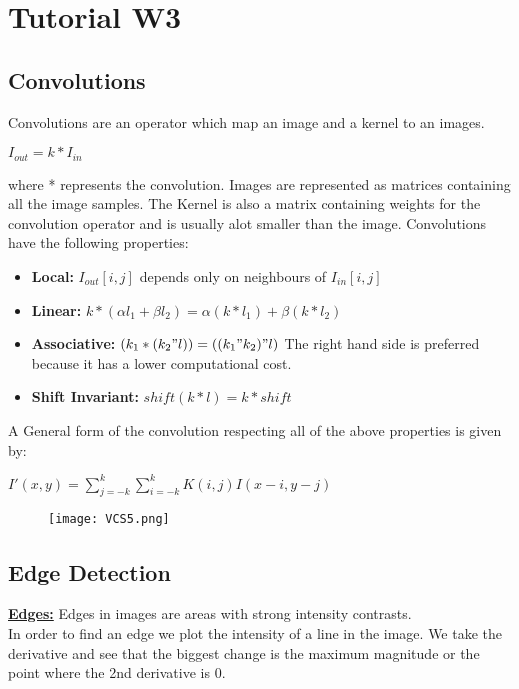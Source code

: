 \documentclass[8pt]{extreport}
\begin{document}
\chapter{Tutorial W3}

\section{Convolutions}

Convolutions are an operator which map an image and a kernel to an images.
\begin{center}
$ I_{out} = k * I_{in}$
\end{center}
where * represents the convolution. Images are represented as matrices containing all the image samples. The Kernel is also a matrix containing weights for the convolution operator and is usually alot smaller than the image. Convolutions have the following properties:
\begin{itemize}
\item \textbf{Local:} $I_{out}[i,j]$ depends only on neighbours of $I_{in}[i,j]$
\item \textbf{Linear:} $k * (\alpha l_1 + \beta l_2) = \alpha(k * l_1) + \beta(k* l_2)$
\item \textbf{Associative:} $(k_1 * (k_2 " l)) = ((k_1 " k_2) " l)$ The right hand side is preferred because it has a lower computational cost.
\item \textbf{Shift Invariant:} $shift(k*l) = k * shift$
\end{itemize}
A General form of the convolution respecting all of the above properties is given by:
\begin{center}
$ I'(x,y) = \displaystyle\sum_{j= -k}^{k} \displaystyle\sum_{i= -k}^{k} K(i,j)I(x-i,y-j)$
\end{center}
\begin{figure}[H]
\centering
\texttt{[image: VCS5.png]}
\end{figure}

\section{Edge Detection}

\underline{\textbf{Edges:}} Edges in images are areas with strong intensity contrasts.\\
In order to find an edge we plot the intensity of a line in the image. We take the derivative and see that the biggest change is the maximum magnitude or the point where the 2nd derivative is 0.
\end{document}
